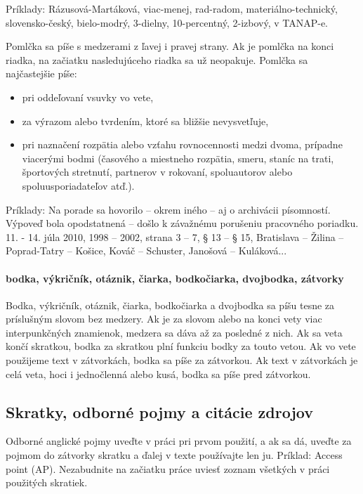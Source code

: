 Príklady: Rázusová-Martáková, viac-menej, rad-radom, materiálno-technický, slovensko-český, bielo-modrý, 3-dielny, 10-percentný, 2-izbový, v TANAP-e. 

Pomlčka sa píše s medzerami z ľavej i pravej strany. Ak je pomlčka na konci riadka, na začiatku nasledujúceho riadka sa už neopakuje. Pomlčka sa najčastejšie píše: 

\begin{itemize}
	\item pri oddeľovaní vsuvky vo vete,
	\item za výrazom alebo tvrdením, ktoré sa bližšie nevysvetľuje,
	\item pri naznačení rozpätia alebo vzťahu rovnocennosti medzi dvoma, prípadne viacerými bodmi (časového a miestneho rozpätia, smeru, staníc na trati, športových stretnutí, partnerov v rokovaní, spoluautorov alebo spoluusporiadateľov atď.). 
\end{itemize}

Príklady: Na porade sa hovorilo – okrem iného – aj o archivácii písomností. Výpoveď bola opodstatnená – došlo k závažnému porušeniu pracovného poriadku. 11. - 14. júla 2010, 1998 – 2002, strana 3 – 7, § 13 – § 15, Bratislava – Žilina – Poprad-Tatry – Košice,  Kováč – Schuster, Janošová – Kuláková... 

\paragraph{bodka, výkričník, otáznik, čiarka, bodkočiarka, dvojbodka, zátvorky}

Bodka, výkričník, otáznik, čiarka, bodkočiarka a dvojbodka sa píšu tesne za príslušným slovom bez medzery. Ak je za slovom alebo na konci vety viac interpunkčných znamienok, medzera sa dáva až za posledné z nich. Ak sa veta končí skratkou, bodka za skratkou plní funkciu bodky za touto vetou. Ak vo vete použijeme text v zátvorkách, bodka sa píše za zátvorkou. Ak text v zátvorkách je celá veta, hoci i jednočlenná alebo kusá, bodka sa píše pred zátvorkou.

\subsection{Skratky, odborné pojmy a citácie zdrojov}

Odborné anglické pojmy uveďte v práci pri prvom použití, a ak sa dá, uveďte za pojmom do zátvorky skratku a ďalej v texte používajte len ju. Príklad: Access point (AP). Nezabudnite na začiatku práce uviesť zoznam všetkých v práci použitých skratiek. 

